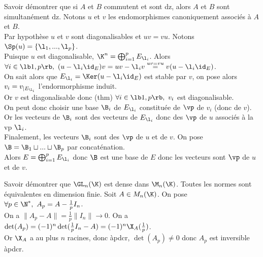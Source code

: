 \documentclass[french, 11pt]{article}
\begin{document}
\begin{exercice}{}{}
    Savoir démontrer que si $A$ et $B$ commutent et sont dz, alors $A$ et $B$ sont simultanément dz.
    \tcblower
    Notons $u$ et $v$ les endomorphismes canoniquement associés à $A$ et $B$.\\
    Par hypothèse $u$ et $v$ sont diagonalisables et $uv=vu$. Notons $\Sp(u)=\{\l_1,...,\l_p\}$.\\
    Puisque $u$ est diagonalisable, $\K^n = \bigoplus_{i=1}^pE_{\l_i}$. Alors $\forall i \in \lb1,p\rb, ~ (u-\l_i\id_E)v=uv-\l_iv\stackrel{uv=vu}{=}v(u-\l_i\id_E)$.\\
    On sait alors que $E_{\l_i}=\Ker(u-\l_i\id_E)$ est stable par $v$, on pose alors $v_i=v_{|E_{\l_i}}$ l'endormorphisme induit.\\
    Or $v$ est diagonalisable donc (thm) $\forall i \in \lb1,p\rb, ~ v_i$ est diagonalisable.\\
    On peut donc choisir une base $\B_i$ de $E_{\l_i}$ constituée de $\vp$ de $v_i$ (donc de $v$).\\
    Or les vecteurs de $\B_i$ sont des vecteurs de $E_{\l_i}$ donc des $\vp$ de $u$ associés à la vp $\l_i$.\\
    Finalement, les vecteurs $\B_i$ sont des $\vp$ de $u$ et de $v$. On pose $\B=\B_1\sqcup...\sqcup\B_p$ par concaténation.\\
    Alors $E=\bigoplus_{i=1}^pE_{\l_i}$ donc $\B$ est une base de $E$ donc les vecteurs sont $\vp$ de $u$ et de $v$.
\end{exercice}

\begin{exercice}{}{}
    Savoir démontrer que $\GL_n(\K)$ est dense dans $\M_n(\K)$.
    \tcblower
    Toutes les normes sont équivalentes en dimension finie. Soit $A\in M_n(\K)$. On pose $\forall p \in \N^*, ~ A_p = A-\frac{1}{p}I_n$.\\
    On a $\|A_p - A\| = \frac{1}{p}\|I_n\| \to 0$. On a $\det(A_p)=(-1)^n\det(\frac{1}{p}I_n-A)=(-1)^n\X_A(\frac{1}{p})$.\\
    Or $\X_A$ a au plus $n$ racines, donc àpdcr, $\det(A_p)\neq0$ donc $A_p$ est inversible àpdcr.
\end{exercice}
\end{document}
